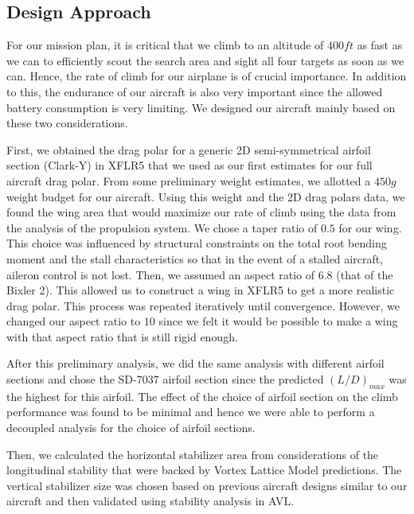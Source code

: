 \documentclass[11pt]{article}
\begin{document}
    \subsection{Design Approach}
    \label{DsignAppr}

    For our mission plan, it is critical that we climb to an altitude of $400 ft$ as fast as we can to efficiently scout the search area and sight all four targets as soon as we can. Hence, the rate of climb for our airplane is of crucial importance. In addition to this, the endurance of our aircraft is also very important since the allowed battery consumption is very limiting. We designed our aircraft mainly based on these two considerations.

    First, we obtained the drag polar for a generic 2D semi-symmetrical airfoil section (Clark-Y) in XFLR5 that we used as our first estimates for our full aircraft drag polar. From some preliminary weight estimates, we allotted a $450g$ weight budget for our aircraft. Using this weight and the 2D drag polars data, we found the wing area that would maximize our rate of climb using the data from the analysis of the propulsion system. We chose a taper ratio of $0.5$ for our wing. This choice was influenced by structural constraints on the total root bending moment and the stall characteristics so that in the event of a stalled aircraft, aileron control is not lost. Then, we assumed an aspect ratio of $6.8$ (that of the Bixler 2). This allowed us to construct a wing in XFLR5 to get a more realistic drag polar. This process was repeated iteratively until convergence. However, we changed our aspect ratio to $10$ since we felt it would be possible to make a wing with that aspect ratio that is still rigid enough.

    After this preliminary analysis, we did the same analysis with different airfoil sections and chose the SD-7037 airfoil section since the predicted $(L/D)_{max}$ was the highest for this airfoil. The effect of the choice of airfoil section on the climb performance was found to be minimal and hence we were able to perform a decoupled analysis for the choice of airfoil sections.

    Then, we calculated the horizontal stabilizer area from considerations of the longitudinal stability that were backed by Vortex Lattice Model predictions. The vertical stabilizer size was chosen based on previous aircraft designs similar to our aircraft and then validated using stability analysis in AVL.
\end{document}

